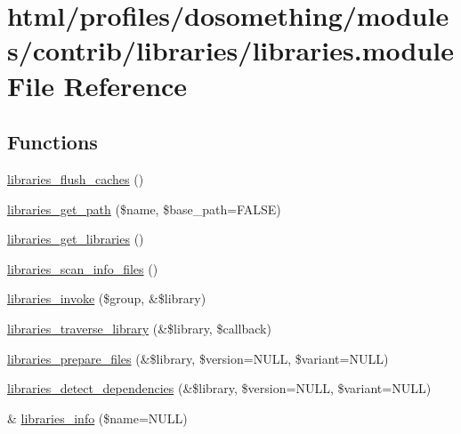 \hypertarget{libraries_8module}{
\section{html/profiles/dosomething/modules/contrib/libraries/libraries.module File Reference}
\label{libraries_8module}
}
\subsection*{Functions}
\begin{DoxyCompactItemize}
\item 
\hyperlink{libraries_8module_a1e8b67a9bc65c658aca7094765a1e1aa}{libraries\_\-flush\_\-caches} ()
\item 
\hyperlink{libraries_8module_af6582ffdd6b230b9532c8fd007448b2e}{libraries\_\-get\_\-path} (\$name, \$base\_\-path=FALSE)
\item 
\hyperlink{libraries_8module_a7bb2b09cadaa8bb75d9d7ae892269cd0}{libraries\_\-get\_\-libraries} ()
\item 
\hyperlink{libraries_8module_a86cb3d1204efd916b9bd09c472457f47}{libraries\_\-scan\_\-info\_\-files} ()
\item 
\hyperlink{libraries_8module_a3ac265c084e45903a8b9c4677d534f5b}{libraries\_\-invoke} (\$group, \&\$library)
\item 
\hyperlink{libraries_8module_a2a884881a93bb93aaf11e3b42d38026a}{libraries\_\-traverse\_\-library} (\&\$library, \$callback)
\item 
\hyperlink{libraries_8module_a763111ce509ad1ae37c607fc367da122}{libraries\_\-prepare\_\-files} (\&\$library, \$version=NULL, \$variant=NULL)
\item 
\hyperlink{libraries_8module_af3d912272d3f4267e03767202fe0f4e7}{libraries\_\-detect\_\-dependencies} (\&\$library, \$version=NULL, \$variant=NULL)
\item 
\& \hyperlink{libraries_8module_ae592b03bbea251cc7c008cd5ed10c861}{libraries\_\-info} (\$name=NULL)
\end{DoxyCompactItemize}
